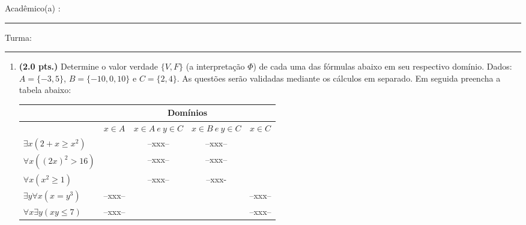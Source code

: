 \documentclass[a4paper,11pt]{article}
\begin{document}


\vskip 0.5cm Acad\^emico(a) : \rule{10cm}{0.4pt} Turma:  \rule{1cm}{0.4pt}

\begin{enumerate}
\setlength{\itemsep}{-1pt}



\item {\bf (2.0 pts.)} Determine o valor verdade $\{V, F \}$ (a interpretação $\Phi $)
de cada uma das fórmulas abaixo em seu respectivo domínio. Dados: $A = \{ -3,  5 \}$, $B = \{ -10, 0, 10\}$ e  $C = \{ 2,  4 \}$.
As questões serão validadas mediante os cálculos em separado. Em seguida preencha a tabela abaixo:

\begin{center}
\begin{tabular}{l|c|c|c|c} \hline \hline
 & \multicolumn{4}{c}{Domínios} \\ \hline
 & $ x \in A$ & $x \in A ~e~ y \in C$ & $x \in B ~e~ y \in C$ & $x \in C$ \\ \hline

$\exists x (2+x \geq x^2)$ & & --xxx-- & --xxx--  & \\ \hline
$\forall x ((2x)^2 > 16)$ & &  --xxx-- & --xxx--  & \\ \hline
$\forall x (x^2 \geq 1)$ & &  --xxx-- & --xxx-  & \\ \hline
$\exists y \forall x (x = y^3)$ & --xxx-- &  & & --xxx-- \\ \hline
$\forall x \exists y (xy \leq 7)$ & --xxx-- &  & & --xxx-- \\ \hline \hline
\end{tabular}
\end{center}



\end{enumerate}
\end{document}
